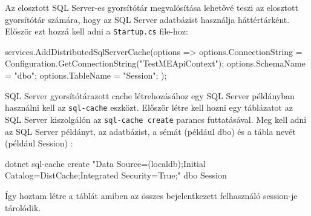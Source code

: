 Az elosztott SQL Server-es gyorsítótár megvalósítása lehetővé teszi az elosztott gyorsítótár számára, hogy az SQL Server adatbázist használja háttértárként. Először ezt hozzá kell adni a \lstinline{Startup.cs} file-hoz:

\begin{cpp}
    services.AddDistributedSqlServerCache(options => {
        options.ConnectionString =
            Configuration.GetConnectionString("TestMEApiContext");
        options.SchemaName = "dbo";
        options.TableName = "Session";
    });
\end{cpp}

SQL Server gyorsítótárazott cache létrehozásához egy SQL Server példányban használni kell az \lstinline{sql-cache} eszközt. Először létre kell hozni egy táblázatot az SQL Server kiszolgálón az \lstinline{sql-cache create} parancs futtatásával. Meg kell adni az SQL Server példányt, az adatbázist, a sémát (például dbo) és a tábla nevét (például Session) \cite{distributedSQLServerCache}:

\begin{cpp}
    dotnet sql-cache create "Data Source=(localdb)\MSSQLLocalDB;Initial
    Catalog=DistCache;Integrated Security=True;" dbo Session
\end{cpp}

Így hoztam létre a táblát amiben az összes bejelentkezett felhasználó session-je tárolódik.
